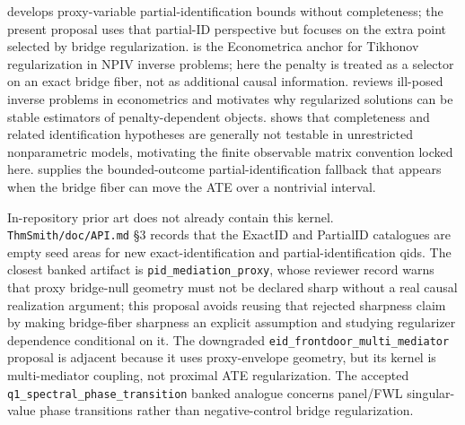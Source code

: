 \documentclass[11pt]{article}
\theoremstyle{definition}
\theoremstyle{plain}
\theoremstyle{remark}
\begin{document}
develops proxy-variable partial-identification bounds without completeness;
the present proposal uses that partial-ID perspective but focuses on the
extra point selected by bridge regularization.  \citet{DarollesFanFlorensRenault2011Econometrica}
is the Econometrica anchor for Tikhonov regularization in NPIV inverse
problems; here the penalty is treated as a selector on an exact bridge fiber,
not as additional causal information.  \citet{Horowitz2014ARE} reviews
ill-posed inverse problems in econometrics and motivates why regularized
solutions can be stable estimators of penalty-dependent objects.  \citet{CanaySantosShaikh2013Econometrica}
shows that completeness and related identification hypotheses are generally
not testable in unrestricted nonparametric models, motivating the finite
observable matrix convention locked here.  \citet{Manski1990AER} supplies the
bounded-outcome partial-identification fallback that appears when the bridge
fiber can move the ATE over a nontrivial interval.

In-repository prior art does not already contain this kernel.
\texttt{ThmSmith/doc/API.md} \S3 records that the ExactID and PartialID
catalogues are empty seed areas for new exact-identification and
partial-identification qids.  The closest banked artifact is
\texttt{pid\_mediation\_proxy}, whose reviewer record warns that proxy
bridge-null geometry must not be declared sharp without a real causal
realization argument; this proposal avoids reusing that rejected sharpness
claim by making bridge-fiber sharpness an explicit assumption and studying
regularizer dependence conditional on it.  The downgraded
\texttt{eid\_frontdoor\_multi\_mediator} proposal is adjacent because it
uses proxy-envelope geometry, but its kernel is multi-mediator coupling, not
proximal ATE regularization.  The accepted
\texttt{q1\_spectral\_phase\_transition} banked analogue concerns panel/FWL
singular-value phase transitions rather than negative-control bridge
regularization.
\end{document}
